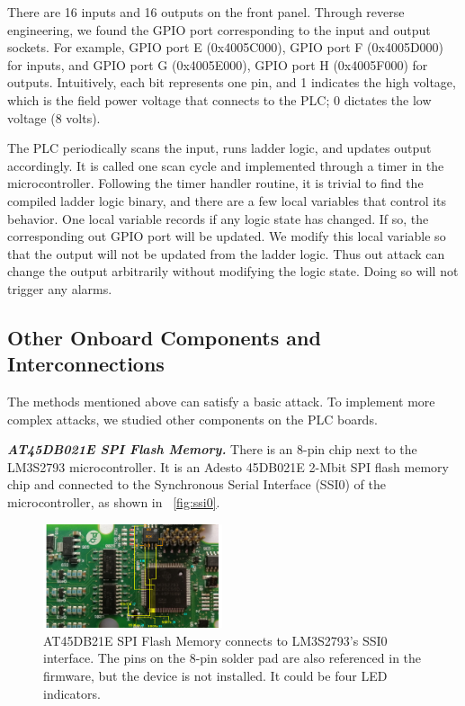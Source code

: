 There are 16 inputs and 16 outputs on the front panel. Through reverse engineering, we found the GPIO port corresponding to the input and output sockets. For example,  GPIO port E (0x4005C000), GPIO port F (0x4005D000) for inputs, and GPIO port G (0x4005E000), GPIO port H (0x4005F000) for outputs. Intuitively, each bit represents one pin, and 1 indicates the high voltage, which is the field power voltage that connects to the PLC; 0 dictates the low voltage (8 volts).

The PLC periodically scans the input, runs ladder logic, and updates output accordingly. It is called one scan cycle and implemented through a timer in the microcontroller. Following the timer handler routine, it is trivial to find the compiled ladder logic binary, and there are a few local variables that control its behavior. One local variable records if any logic state has changed. If so, the corresponding out GPIO port will be updated. We modify this local variable so that the output will not be updated from the ladder logic. Thus out attack can change the output arbitrarily without modifying the logic state. Doing so will not trigger any alarms.


\subsection{Other Onboard Components and Interconnections}

The methods mentioned above can satisfy a basic attack. To implement more complex attacks, we studied other components on the PLC boards.

\textbf{\textit{AT45DB021E SPI Flash Memory.}} There is an 8-pin chip
next to the LM3S2793 microcontroller. It is an Adesto 45DB021E 2-Mbit SPI flash memory chip and connected to the Synchronous Serial Interface (SSI0) of the microcontroller, as shown in ~\autoref{fig:ssi0}.



\begin{figure}[th]
	\includegraphics[width=0.47\textwidth]{figures/ssi0}
	\centering
	\caption{AT45DB21E SPI Flash Memory connects to LM3S2793's SSI0 interface. The pins on the 8-pin solder pad are also referenced in the firmware, but the device is not installed. It could be four LED indicators.}
	\label{fig:ssi0}
\end{figure}

